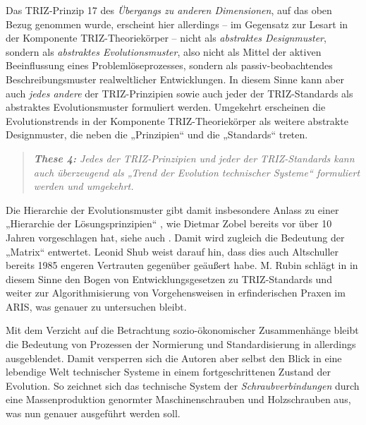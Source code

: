 \documentclass[11pt,a4paper]{article}
\begin{document}
Das TRIZ-Prinzip 17 des \emph{Übergangs zu anderen Dimensionen}, auf das oben
Bezug genommen wurde, erscheint hier allerdings -- im Gegensatz zur Lesart in
der Komponente TRIZ-Theoriekörper -- nicht als \emph{abstraktes Designmuster},
sondern als \emph{abstraktes Evolutionsmuster}, also nicht als Mittel der
aktiven Beeinflussung eines Problemlöseprozesses, sondern als
passiv-beobachtendes Beschreibungsmuster realweltlicher Entwicklungen.  In
diesem Sinne kann aber auch \emph{jedes andere} der TRIZ-Prinzipien sowie auch
jeder der TRIZ-Standards als abstraktes Evolutionsmuster formuliert
werden. Umgekehrt erscheinen die Evolutionstrends in der Komponente
TRIZ-Theoriekörper als weitere abstrakte Designmuster, die neben die
„Prinzipien“ und die „Standards“ treten.
\begin{quote}\it
  \textbf{These 4:} Jedes der TRIZ-Prinzipien und jeder der TRIZ-Standards
  kann auch überzeugend als „Trend der Evolution technischer Systeme“
  formuliert werden und umgekehrt.
\end{quote}
Die Hierarchie der Evolutionsmuster gibt damit insbesondere Anlass zu einer
„Hierarchie der Lösungsprinzipien“ \cite[Kap. 3]{Zobel2016}, wie Dietmar Zobel
bereits vor über 10 Jahren vorgeschlagen hat, siehe auch \cite{Zobel2020}.
Damit wird zugleich die Bedeutung der „Matrix“ entwertet. Leonid Shub
\cite{Shub2006} weist darauf hin, dass dies auch Altschuller bereits 1985
engeren Vertrauten gegenüber geäußert habe.  M. Rubin schlägt in
\cite{Rubin2019} in diesem Sinne den Bogen von Entwicklungsgesetzen zu
TRIZ-Standards und weiter zur Algorithmisierung von Vorgehensweisen in
erfinderischen Praxen im ARIS, was genauer zu untersuchen bleibt.

Mit dem Verzicht auf die Betrachtung sozio-ökonomischer Zusammenhänge bleibt
die Bedeutung von Prozessen der Normierung und Standardisierung in
\cite{TESE2018} allerdings ausgeblendet. Damit versperren sich die Autoren
aber selbst den Blick in eine lebendige Welt technischer Systeme in einem
fortgeschrittenen Zustand der Evolution. So zeichnet sich das technische
System der \emph{Schraubverbindungen} durch eine Massenproduktion genormter
Maschinenschrauben und Holzschrauben aus, was nun genauer ausgeführt werden
soll.
\end{document}
